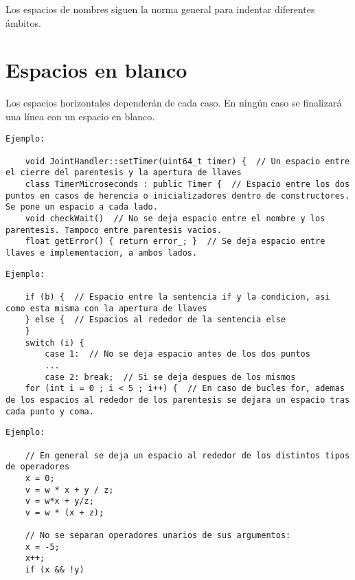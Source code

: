 
Los espacios de nombres siguen la norma general para indentar diferentes ámbitos.

\section{Espacios en blanco}\label{sec:codificacionSW:espacios_blanco}

Los espacios horizontales dependerán de cada caso. En ningún caso se finalizará una línea con un espacio en blanco.


    \lstset{language=C, breaklines=true, basicstyle=\footnotesize}
    \begin{lstlisting}[frame=single]
Ejemplo: 

    void JointHandler::setTimer(uint64_t timer) {  // Un espacio entre el cierre del parentesis y la apertura de llaves
    class TimerMicroseconds : public Timer {  // Espacio entre los dos puntos en casos de herencia o inicializadores dentro de constructores. Se pone un espacio a cada lado.
    void checkWait()  // No se deja espacio entre el nombre y los parentesis. Tampoco entre parentesis vacios.
    float getError() { return error_; }  // Se deja espacio entre llaves e implementacion, a ambos lados.

    \end{lstlisting}


    \lstset{language=C, breaklines=true, basicstyle=\footnotesize}
    \begin{lstlisting}[frame=single]
Ejemplo: 

    if (b) {  // Espacio entre la sentencia if y la condicion, asi como esta misma con la apertura de llaves
    } else {  // Espacios al rededor de la sentencia else
    }
    switch (i) {
        case 1:  // No se deja espacio antes de los dos puntos
        ...
        case 2: break;  // Si se deja despues de los mismos
    for (int i = 0 ; i < 5 ; i++) {  // En caso de bucles for, ademas de los espacios al rededor de los parentesis se dejara un espacio tras cada punto y coma.
    \end{lstlisting}
    

    \lstset{language=C, breaklines=true, basicstyle=\footnotesize}
    \begin{lstlisting}[frame=single]
Ejemplo: 

    // En general se deja un espacio al rededor de los distintos tipos de operadores
    x = 0;
    v = w * x + y / z;
    v = w*x + y/z;
    v = w * (x + z);
    
    // No se separan operadores unarios de sus argumentos:
    x = -5;
    x++;
    if (x && !y)

    \end{lstlisting}
    
